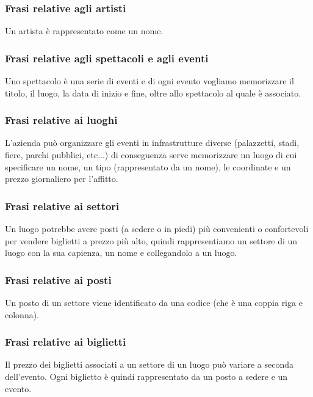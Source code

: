 \documentclass[a4paper,11pt]{article}
\begin{document}
\subsubsection*{Frasi relative agli artisti}

Un artista è rappresentato come un nome.

\subsubsection*{Frasi relative agli spettacoli e agli eventi}

Uno spettacolo è una serie di eventi e di ogni evento vogliamo memorizzare il titolo, il luogo, la data di inizio e fine, oltre allo spettacolo al quale è associato.

\subsubsection*{Frasi relative ai luoghi}

L'azienda può organizzare gli eventi in infrastrutture diverse (palazzetti, stadi, fiere, parchi pubblici, etc...) di conseguenza serve memorizzare un luogo di cui specificare un nome, un tipo (rappresentato da un nome), le coordinate e un prezzo giornaliero per l'affitto.

\subsubsection*{Frasi relative ai settori}

Un luogo potrebbe avere posti (a sedere o in piedi) più convenienti o confortevoli per vendere biglietti a prezzo più alto, quindi rappresentiamo un settore di un luogo con la sua capienza, un nome e collegandolo a un luogo.

\subsubsection*{Frasi relative ai posti}

Un posto di un settore viene identificato da una codice (che è una coppia riga e colonna).

\subsubsection*{Frasi relative ai biglietti}

Il prezzo dei biglietti associati a un settore di un luogo può variare a seconda dell'evento. Ogni biglietto è quindi rappresentato da un posto a sedere e un evento.
\end{document}
